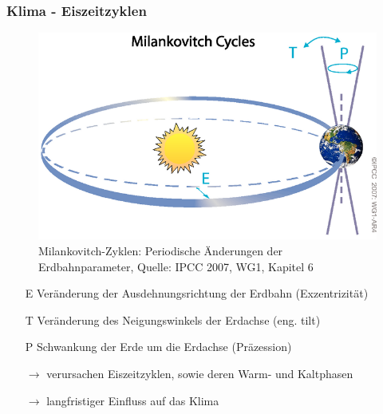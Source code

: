\begin{frame}
\frametitle{Klima - Eiszeitzyklen}
\begin{figure}
	\centering
	\includegraphics{bilder/milankovitch_IPCC2007_AR4.png}
	\caption{Milankovitch-Zyklen: Periodische Änderungen der Erdbahnparameter, Quelle: IPCC 2007, WG1, Kapitel 6}
\end{figure}
\begin{itemize}
	\item[E] Veränderung der Ausdehnungsrichtung der Erdbahn (Exzentrizität)%
	\item[T] Veränderung des Neigungswinkels der Erdachse (eng. tilt)
	\item[P] Schwankung der Erde um die Erdachse (Präzession) %
	\item[$\rightarrow$] verursachen Eiszeitzyklen, sowie deren Warm- und Kaltphasen
	\item[$\rightarrow$] langfristiger Einfluss auf das Klima
\end{itemize}


\end{frame}
